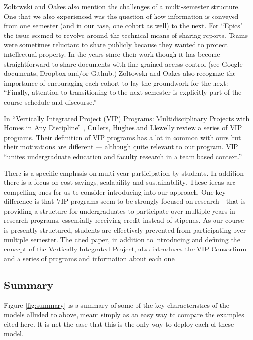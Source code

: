 Zoltowski and Oakes also mention the challenges of a multi-semester structure. One that we also experienced was the question of how information is conveyed from one semester (and in our case, one cohort as well) to the next. For ``Epics" the issue seemed to revolve around the technical means of sharing reports. Teams were sometimes reluctant to share publicly because they wanted to protect intellectual property. In the years since their work though it has become straightforward to share documents with fine grained access control (see Google documents, Dropbox and/or Github.) Zoltowski and Oakes also recognize the importance of encouraging each cohort to lay the groundwork for the next: ``Finally, attention to transitioning to the next semester is explicitly part of the course schedule and discourse.''

In ``Vertically Integrated Project (VIP) Programs: Multidisciplinary Projects with Homes in Any Discipline'' \cite{VIP}, Cullers, Hughes and Llewelly review a series of VIP programs. Their definition of VIP programs has a lot in common with ours but their motivations are different --- although quite relevant to our program. VIP ``unites undergraduate education and faculty research in a team based context.'' 

There is a specific emphasis on multi-year participation by students. In addition there is a focus on cost-savings, scalability and sustainability. These ideas are compelling ones for us to consider introducing into our approach. One key difference is that VIP programs seem to be strongly focused on research - that is providing a structure for undergraduates to participate over multiple years in research programs, essentially receiving credit instead of stipends. As our course is presently structured, students are effectively prevented from participating over multiple semester. The cited paper, in addition to introducing and defining the concept of the Vertically Integrated Project, also introduces the VIP Consortium \cite{VIPSite} and a series of programs and information about each one.

\subsection{Summary}
Figure \ref{fig:summary} is a summary of some of the key characteristics of the models alluded to above, meant simply as an easy way to compare the examples cited here. It is not the case that this is the only way to deploy each of these model.

